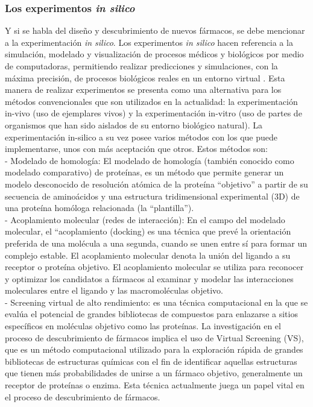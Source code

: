 \subsubsection{Los experimentos \textit{in silico}}
\noindent Y si se habla del diseño y descubrimiento de nuevos fármacos, se debe mencionar a la experimentación \textit{in silico}. Los experimentos \textit{in silico} hacen referencia a la simulación, modelado y visualización de procesos médicos y biológicos por medio de computadoras, permitiendo realizar predicciones y simulaciones, con la máxima precisión, de procesos biológicos reales en un entorno virtual \cite{5}. Esta manera de realizar experimentos se presenta como una alternativa para los métodos convencionales que son utilizados en la actualidad: la experimentación in-vivo (uso de ejemplares vivos) y la experimentación in-vitro (uso de partes de organismos que han sido aislados de su entorno biológico natural). La experimentación in-silico a su vez posee varios métodos con los que puede implementarse, unos con más aceptación que otros. Estos métodos son\cite{6}:\\

- Modelado de homología: El modelado de homología (también conocido como modelado comparativo) de proteínas, es un método que permite generar un modelo desconocido de resolución atómica de la proteína ``objetivo'' a partir de su secuencia de aminoácidos y una estructura tridimensional experimental (3D) de una proteína homóloga relacionada (la ``plantilla'').\\

- Acoplamiento molecular (redes de interacción): En el campo del modelado molecular, el “acoplamiento (docking) es una técnica que prevé la orientación preferida de una molécula a una segunda, cuando se unen entre sí para formar un complejo estable. El acoplamiento molecular denota la unión del ligando a su receptor o proteína objetivo. El acoplamiento molecular se utiliza para reconocer y optimizar los candidatos a fármacos al examinar y modelar las interacciones moleculares entre el ligando y las macromoléculas objetivo.\\

- Screening virtual de alto rendimiento: es una técnica computacional en la que se evalúa el potencial de grandes bibliotecas de compuestos para enlazarse a sitios específicos en moléculas objetivo como las proteínas. La investigación en el proceso de descubrimiento de fármacos implica el uso de Virtual Screening (VS), que es un método computacional utilizado para la exploración rápida de grandes bibliotecas de estructuras químicas con el fin de identificar aquellas estructuras que tienen más probabilidades de unirse a un fármaco objetivo, generalmente un receptor de proteínas o enzima. Esta técnica actualmente juega un papel vital en el proceso de descubrimiento de fármacos.\\

